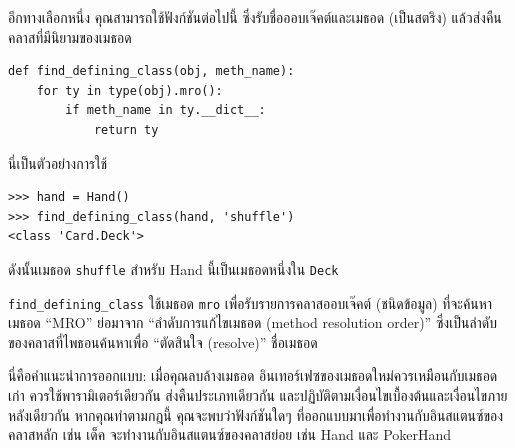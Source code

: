 
อีกทางเลือกหนึ่ง คุณสามารถใช้ฟังก์ชันต่อไปนี้ ซึ่งรับชื่อออบเจ๊คต์และเมธอด (เป็นสตริง) แล้วส่งคืนคลาสที่มีนิยามของเมธอด

\begin{verbatim}
def find_defining_class(obj, meth_name):
    for ty in type(obj).mro():
        if meth_name in ty.__dict__:
            return ty
\end{verbatim}
%
นี่เป็นตัวอย่างการใช้

\begin{verbatim}
>>> hand = Hand()
>>> find_defining_class(hand, 'shuffle')
<class 'Card.Deck'>
\end{verbatim}
%

ดังนั้นเมธอด {\tt shuffle} สำหรับ  Hand นี้เป็นเมธอดหนึ่งใน {\tt Deck}



\verb"find_defining_class" ใช้เมธอด {\tt mro} เพื่อรับรายการคลาสออบเจ๊คต์ (ชนิดข้อมูล) ที่จะค้นหาเมธอด 
``MRO'' ย่อมาจาก ``ลำดับการแก้ไขเมธอด (method resolution order)'' ซึ่งเป็นลำดับของคลาสที่ไพธอนค้นหาเพื่อ ``ตัดสินใจ (resolve)'' ชื่อเมธอด



นี่คือคำแนะนำการออกแบบ: เมื่อคุณลบล้างเมธอด อินเทอร์เฟซของเมธอดใหม่ควรเหมือนกับเมธอดเก่า ควรใช้พารามิเตอร์เดียวกัน ส่งคืนประเภทเดียวกัน และปฏิบัติตามเงื่อนไขเบื้องต้นและเงื่อนไขภายหลังเดียวกัน 
หากคุณทำตามกฎนี้ คุณจะพบว่าฟังก์ชันใดๆ ที่ออกแบบมาเพื่อทำงานกับอินสแตนซ์ของคลาสหลัก เช่น เด็ค จะทำงานกับอินสแตนซ์ของคลาสย่อย เช่น Hand และ PokerHand

